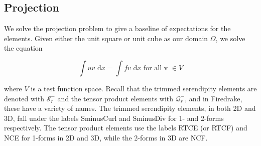 \documentclass[manuscript,screen]{acmart}
\newcommand\josh[1]{\textbf{\textcolor[rgb]{0,.5,1}{[Josh: #1]}}}
\begin{document}



  \subsection{Projection}
  
  We solve the projection problem to give a baseline of expectations for the elements. Given either the unit square or unit cube as our domain $\Omega$, we solve the equation 
  
  \begin{equation}
      \int u v  \text{ d}x = \int f v \text{ d}x \text{ for all v } \in V
  \end{equation}

 \noindent where $V$ is a test function space.   Recall that the trimmed serendipity elements are denoted with $\mathcal{S}_r^-$ and the tensor product elements with $\mathcal{Q}^-_r$, and in Firedrake, these have a variety of names.  The trimmed serendipity elements, in both 2D and 3D, fall under the labels {\selectfont SminusCurl} and {\selectfont SminusDiv} for 1- and 2-forms respectively.  The tensor product elements use the labels {\selectfont RTCE} (or {\selectfont RTCF}) and  {\selectfont NCE} for 1-forms in 2D and 3D, while the 2-forms in 3D are  {\selectfont NCF}.  %

\end{document}
